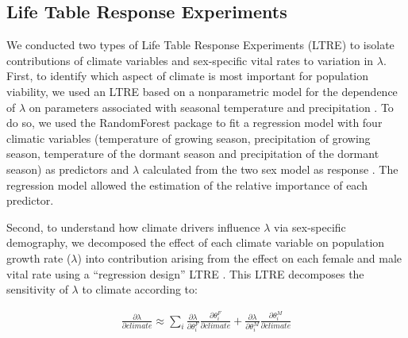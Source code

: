 \documentclass[12pt]{article}\usepackage[]{graphicx}\usepackage[dvipsnames]{xcolor}
\newcommand{\jacob}[2]{{\color{blue}{#1}}\footnote{\textit{\color{blue}{#2}}}}
\begin{document}
\subsection*{Life Table Response Experiments}
We conducted two types of Life Table Response Experiments (LTRE) to isolate contributions of climate variables and sex-specific vital rates to variation in $\lambda$.
First, to identify which aspect of climate is most important for population viability, we used an LTRE based on a nonparametric model for the dependence of $\lambda$ on parameters associated with seasonal temperature and precipitation \citep{ellner2016data}. 
To do so, we used the RandomForest package to fit a regression model with four climatic variables (temperature of growing season, precipitation of growing season, temperature of the dormant season and precipitation of the dormant season) as predictors  and $\lambda$  calculated from the two sex model as response \citep{liaw2002classification}.
The regression model allowed the estimation of the relative importance of each predictor. 

Second, to understand how climate drivers influence $\lambda$ via sex-specific demography, we decomposed the effect of each climate variable on population growth rate ($\lambda$) into contribution arising from the effect on each female and male vital rate using a ``regression design'' LTRE \citep{caswell1989analysis,caswell2000matrix}.
This LTRE decomposes the sensitivity of $\lambda$ to climate according to:

\begin{align}\label{eq:ltresex}
\frac{\partial \lambda}{\partial climate} \approx \sum_{i} \frac{\partial \lambda}{\partial \theta^{F}_{i}} \frac{\partial \theta^{F}_{i}}{\partial climate} + \frac{\partial \lambda}{\partial \theta^{M}_{i}} \frac{\partial \theta^{M}_{i}}{\partial climate}
\end{align}
\end{document}
